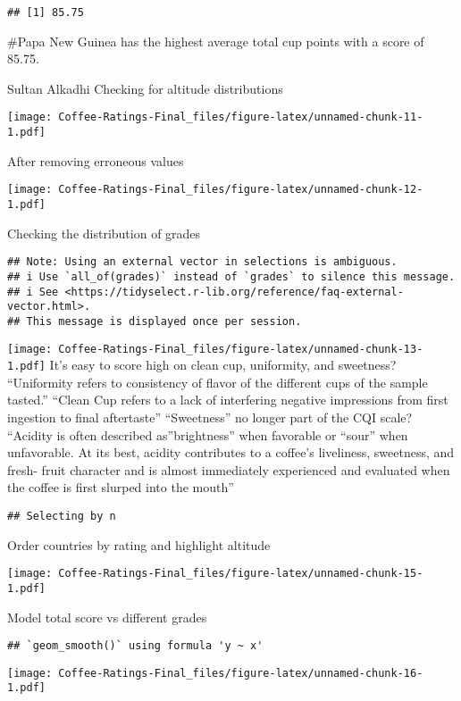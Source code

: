 \documentclass[
]{article}
\begin{document}
\begin{verbatim}
## [1] 85.75
\end{verbatim}

\#Papa New Guinea has the highest average total cup points with a score
of 85.75.

Sultan Alkadhi Checking for altitude distributions

\texttt{[image: Coffee-Ratings-Final\_files/figure-latex/unnamed-chunk-11-1.pdf]}

After removing erroneous values

\texttt{[image: Coffee-Ratings-Final\_files/figure-latex/unnamed-chunk-12-1.pdf]}

Checking the distribution of grades

\begin{verbatim}
## Note: Using an external vector in selections is ambiguous.
## i Use `all_of(grades)` instead of `grades` to silence this message.
## i See <https://tidyselect.r-lib.org/reference/faq-external-vector.html>.
## This message is displayed once per session.
\end{verbatim}

\texttt{[image: Coffee-Ratings-Final\_files/figure-latex/unnamed-chunk-13-1.pdf]}
It's easy to score high on clean cup, uniformity, and sweetness?
``Uniformity refers to consistency of flavor of the different cups of
the sample tasted.'' ``Clean Cup refers to a lack of interfering
negative impressions from first ingestion to final aftertaste''
``Sweetness'' no longer part of the CQI scale? ``Acidity is often
described as''brightness'' when favorable or ``sour'' when unfavorable.
At its best, acidity contributes to a coffee's liveliness, sweetness,
and fresh- fruit character and is almost immediately experienced and
evaluated when the coffee is first slurped into the mouth''

\begin{verbatim}
## Selecting by n
\end{verbatim}

Order countries by rating and highlight altitude

\texttt{[image: Coffee-Ratings-Final\_files/figure-latex/unnamed-chunk-15-1.pdf]}

Model total score vs different grades

\begin{verbatim}
## `geom_smooth()` using formula 'y ~ x'
\end{verbatim}

\texttt{[image: Coffee-Ratings-Final\_files/figure-latex/unnamed-chunk-16-1.pdf]}
\end{document}
